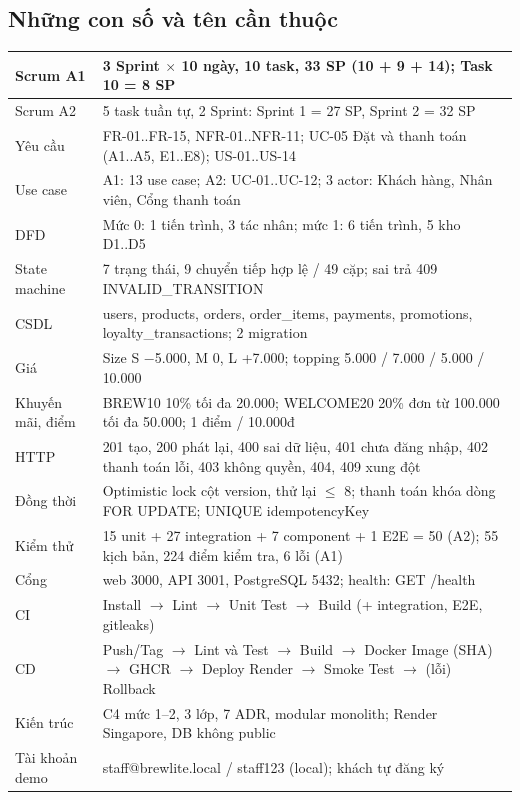 \documentclass[11pt,a4paper]{article}
\begin{document}
\subsection*{Những con số và tên cần thuộc}
\renewcommand{\arraystretch}{1.25}
\begin{longtable}{|p{4.2cm}|p{11.8cm}|}
\hline
Scrum A1 & 3 Sprint $\times$ 10 ngày, 10 task, 33 SP (10 + 9 + 14); Task 10 = 8 SP \\ \hline
Scrum A2 & 5 task tuần tự, 2 Sprint: Sprint 1 = 27 SP, Sprint 2 = 32 SP \\ \hline
Yêu cầu & FR-01..FR-15, NFR-01..NFR-11; UC-05 Đặt và thanh toán (A1..A5, E1..E8); US-01..US-14 \\ \hline
Use case & A1: 13 use case; A2: UC-01..UC-12; 3 actor: Khách hàng, Nhân viên, Cổng thanh toán \\ \hline
DFD & Mức 0: 1 tiến trình, 3 tác nhân; mức 1: 6 tiến trình, 5 kho D1..D5 \\ \hline
State machine & 7 trạng thái, 9 chuyển tiếp hợp lệ / 49 cặp; sai trả 409 INVALID\_TRANSITION \\ \hline
CSDL & users, products, orders, order\_items, payments, promotions, loyalty\_transactions; 2 migration \\ \hline
Giá & Size S $-$5.000, M 0, L +7.000; topping 5.000 / 7.000 / 5.000 / 10.000 \\ \hline
Khuyến mãi, điểm & BREW10 10\% tối đa 20.000; WELCOME20 20\% đơn từ 100.000 tối đa 50.000; 1 điểm / 10.000đ \\ \hline
HTTP & 201 tạo, 200 phát lại, 400 sai dữ liệu, 401 chưa đăng nhập, 402 thanh toán lỗi, 403 không quyền, 404, 409 xung đột \\ \hline
Đồng thời & Optimistic lock cột version, thử lại $\le$ 8; thanh toán khóa dòng FOR UPDATE; UNIQUE idempotencyKey \\ \hline
Kiểm thử & 15 unit + 27 integration + 7 component + 1 E2E = 50 (A2); 55 kịch bản, 224 điểm kiểm tra, 6 lỗi (A1) \\ \hline
Cổng & web 3000, API 3001, PostgreSQL 5432; health: GET /health \\ \hline
CI & Install $\rightarrow$ Lint $\rightarrow$ Unit Test $\rightarrow$ Build (+ integration, E2E, gitleaks) \\ \hline
CD & Push/Tag $\rightarrow$ Lint và Test $\rightarrow$ Build $\rightarrow$ Docker Image (SHA) $\rightarrow$ GHCR $\rightarrow$ Deploy Render $\rightarrow$ Smoke Test $\rightarrow$ (lỗi) Rollback \\ \hline
Kiến trúc & C4 mức 1–2, 3 lớp, 7 ADR, modular monolith; Render Singapore, DB không public \\ \hline
Tài khoản demo & staff@brewlite.local / staff123 (local); khách tự đăng ký \\ \hline
\end{longtable}

\newpage
\tableofcontents
\newpage
\end{document}
